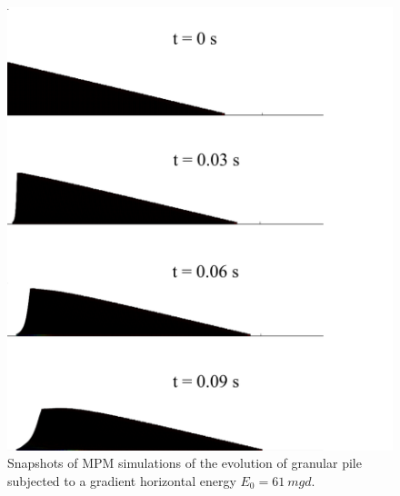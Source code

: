 \begin{figure}[tbph]
\centering
\includegraphics[width=\textwidth]{Uniform_Slope_Profile_200J}
\caption{Snapshots of MPM simulations of the evolution of granular pile 
subjected to a gradient horizontal energy $E_0 = 61 \ mgd$.}
\label{fig:Uniform_Slope_Profile_200J}
\end{figure}


